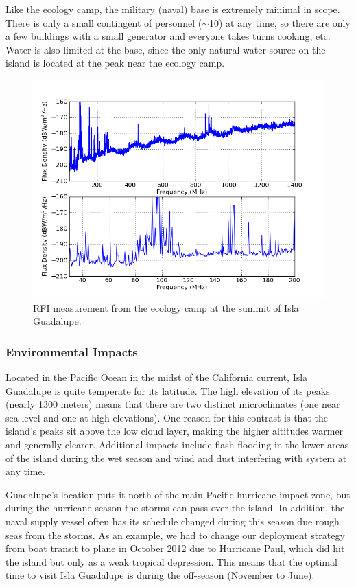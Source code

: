Like the ecology camp, the military (naval) base is extremely minimal in scope. There is only a small contingent of personnel ($\sim$10) at any time, so there are only a few buildings with a small generator and everyone takes turns cooking, etc. Water is also limited at the base, since the only natural water source on the island is located at the peak near the ecology camp. 

\begin{figure}[tb]
\begin{center}
\includegraphics[width=0.9\linewidth]{RFI_testing/figures/GI_3__cal.png}
\caption{RFI measurement from the ecology camp at the summit of Isla Guadalupe.}
\label{Fig:guadsummit}
\end{center}
\end{figure}

\subsubsection{Environmental Impacts}

Located in the Pacific Ocean in the midst of the California current, Isla Guadalupe is quite temperate for its latitude. The high elevation of its peaks (nearly 1300 meters) means that there are two distinct microclimates (one near sea level and one at high elevations). One reason for this contrast is that the island's peaks sit above the low cloud layer, making the higher altitudes warmer and generally clearer. Additional impacts include flash flooding in the lower areas of the island during the wet season and wind and dust interfering with system at any time. 

Guadalupe's location puts it north of the main Pacific hurricane impact zone, but during the hurricane season the storms can pass over the island. In addition, the naval supply vessel often has its schedule changed during this season due rough seas from the storms. As an example, we had to change our deployment strategy from boat transit to plane in October 2012 due to Hurricane Paul, which did hit the island but only as a weak tropical depression. This means that the optimal time to visit Isla Guadalupe is during the off-season (November to June). 


